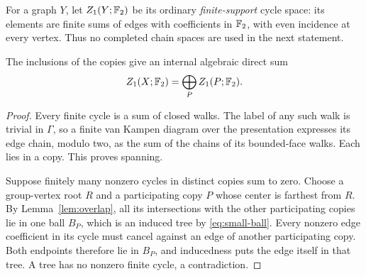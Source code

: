 For a graph \(Y\), let \(Z_1(Y;\mathbb F_2)\) be its ordinary
\emph{finite-support} cycle space: its elements are finite sums of edges
with coefficients in \(\mathbb F_2\), with even incidence at every vertex.
Thus no completed chain spaces are used in the next statement.

\begin{lemma}\label{lem:cycle-sum}
The inclusions of the copies give an internal algebraic direct sum
\begin{equation}\label{eq:cycle-sum}
Z_1(X;\mathbb F_2)=\bigoplus_P Z_1(P;\mathbb F_2).
\end{equation}
\end{lemma}

\begin{proof}
Every finite cycle is a sum of closed walks. The label of any such walk
is trivial in \(\Gamma\), so a finite van Kampen diagram over the
presentation expresses its
edge chain, modulo two, as the sum of the chains of its bounded-face
walks. Each lies in a copy. This proves spanning.

Suppose finitely many nonzero cycles in distinct copies sum to zero.
Choose a group-vertex root \(R\) and a participating copy \(P\) whose
center is farthest from \(R\). By Lemma~\ref{lem:overlap}, all its
intersections with the other participating copies lie in one ball
\(B_P\), which is an induced tree by \eqref{eq:small-ball}. Every
nonzero edge coefficient in its cycle must cancel against an edge of
another participating copy. Both endpoints therefore lie in \(B_P\),
and inducedness puts the edge itself in that tree. A tree has no nonzero
finite cycle, a contradiction.
\end{proof}
